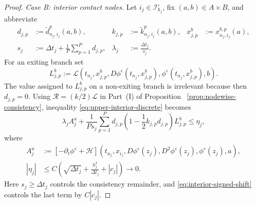 \documentclass[10pt,a4paper]{amsart}
\newcommand{\dt}{\Delta t}
\begin{document}
\begin{proof}
		\smallskip
		\noindent\textit{Case B: interior contact nodes.}
		Let $i_j\in\mathcal I_{h_j}^\circ$, fix $(a,b)\in A\times B$, and abbreviate
		\[
		\begin{aligned}
			d_{j,p}&:=\widetilde d_{n_j,i_j}^p(a,b),&
			k_{j,p}&:=\widetilde k_{n_j,i_j}^p(a,b),&
			x_{j,p}^b&:=x_{n_j,i_j}^{b,p}(a),\\
			s_j&:=\dt_j+\frac1P\sum_{p=1}^P d_{j,p},&
			\lambda_j&:=\frac{\dt_j}{s_j}.&&
		\end{aligned}
		\]
		For an exiting branch set
		\[
		L_{j,p}^b:=\mathcal L(t_{n_j},x_{j,p}^b,
		D\phi^\varepsilon(t_{n_j},x_{j,p}^b),
		\phi^\varepsilon(t_{n_j},x_{j,p}^b),b).
		\]
		The value assigned to $L_{j,p}^b$ on a non-exiting branch is irrelevant
		because then $d_{j,p}=0$.  Using
		$\mathcal R=(k/2)\mathcal L$ in Part~\textup{(I)} of Proposition
		~\ref{prop:nodewise-consistency}, inequality
		\eqref{eq:upper-interior-discrete} becomes
		\begin{equation}
			\lambda_j A_j^a+\frac1{Ps_j}\sum_{p=1}^P d_{j,p}
			\left(1-\frac12k_{j,p}d_{j,p}\right)L_{j,p}^b
			\le\eta_j,
			\label{eq:sub-normalized}
		\end{equation}
		where
		\begin{align*}
			A_j^a&:=[-\partial_t\phi^\varepsilon+\mathcal H]
			(t_{n_j},x_{i_j},D\phi^\varepsilon(z_j),D^2\phi^\varepsilon(z_j),
			\phi^\varepsilon(z_j),a),\\
			|\eta_j|&\le C\left(
			\sqrt{\dt_j}+\frac{h_j^2}{\dt_j}+|c_j|\right)\longrightarrow0.
		\end{align*}
		Here $s_j\ge\dt_j$ controls the consistency remainder, and
		\eqref{eq:interior-signed-shift} controls the last term by $C|c_j|$.
		

\end{proof}
\end{document}
